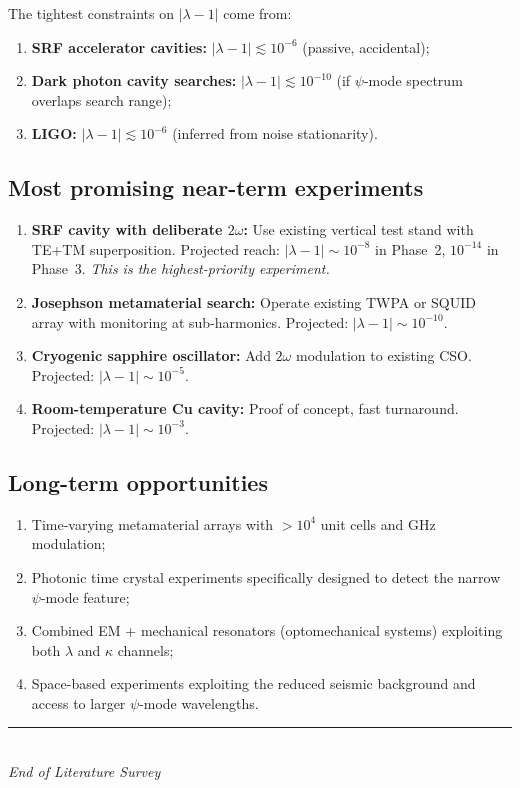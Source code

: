 \documentclass[12pt,letterpaper]{article}
\begin{document}
The tightest constraints on $|\lambda - 1|$ come from:
\begin{enumerate}
  \item \textbf{SRF accelerator cavities:} $|\lambda - 1| \lesssim 10^{-6}$
    (passive, accidental);
  \item \textbf{Dark photon cavity searches:} $|\lambda - 1| \lesssim 10^{-10}$
    (if $\psi$-mode spectrum overlaps search range);
  \item \textbf{LIGO:} $|\lambda - 1| \lesssim 10^{-6}$
    (inferred from noise stationarity).
\end{enumerate}

\subsection{Most promising near-term experiments}

\begin{enumerate}
  \item \textbf{SRF cavity with deliberate $2\omega$:} Use existing
    vertical test stand with TE+TM superposition.  Projected reach:
    $|\lambda - 1| \sim 10^{-8}$ in Phase~2, $10^{-14}$ in Phase~3.
    \emph{This is the highest-priority experiment.}

  \item \textbf{Josephson metamaterial search:} Operate existing TWPA
    or SQUID array with monitoring at sub-harmonics.  Projected:
    $|\lambda - 1| \sim 10^{-10}$.

  \item \textbf{Cryogenic sapphire oscillator:} Add $2\omega$
    modulation to existing CSO.  Projected: $|\lambda - 1| \sim 10^{-5}$.

  \item \textbf{Room-temperature Cu cavity:} Proof of concept, fast
    turnaround.  Projected: $|\lambda - 1| \sim 10^{-3}$.
\end{enumerate}

\subsection{Long-term opportunities}

\begin{enumerate}[noitemsep]
  \item Time-varying metamaterial arrays with $> 10^4$ unit cells
    and GHz modulation;
  \item Photonic time crystal experiments specifically designed to
    detect the narrow $\psi$-mode feature;
  \item Combined EM + mechanical resonators (optomechanical systems)
    exploiting both $\lambda$ and $\kappa$ channels;
  \item Space-based experiments exploiting the reduced seismic
    background and access to larger $\psi$-mode wavelengths.
\end{enumerate}

\vfill
\begin{center}
\rule{0.5\textwidth}{0.4pt}\\[6pt]
\textit{End of Literature Survey}
\end{center}
\end{document}
